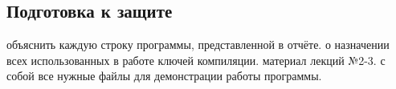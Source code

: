 \subsection{Подготовка к защите}
\begin{enumerate}
     объяснить каждую строку программы, представленной в отчёте.
     о назначении всех использованных в работе ключей компиляции.
     материал лекций №2-3.
     с собой все нужные файлы для демонстрации работы программы.
\end{enumerate}
